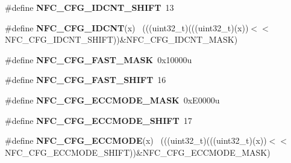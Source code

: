 \begin{DoxyCompactItemize}
\item 
\hypertarget{group___n_f_c___register___masks_gaa0926596a807fb2f899e6c616aeac970}{}\#define {\bfseries N\+F\+C\+\_\+\+C\+F\+G\+\_\+\+I\+D\+C\+N\+T\+\_\+\+S\+H\+I\+F\+T}~13\label{group___n_f_c___register___masks_gaa0926596a807fb2f899e6c616aeac970}

\item 
\hypertarget{group___n_f_c___register___masks_ga80376617d344449f3f0742d6030ebe5a}{}\#define {\bfseries N\+F\+C\+\_\+\+C\+F\+G\+\_\+\+I\+D\+C\+N\+T}(x)                                              ~(((uint32\+\_\+t)(((uint32\+\_\+t)(x))$<$$<$N\+F\+C\+\_\+\+C\+F\+G\+\_\+\+I\+D\+C\+N\+T\+\_\+\+S\+H\+I\+F\+T))\&N\+F\+C\+\_\+\+C\+F\+G\+\_\+\+I\+D\+C\+N\+T\+\_\+\+M\+A\+S\+K)\label{group___n_f_c___register___masks_ga80376617d344449f3f0742d6030ebe5a}

\item 
\hypertarget{group___n_f_c___register___masks_ga1548415338ac875affc2991c4e8018fc}{}\#define {\bfseries N\+F\+C\+\_\+\+C\+F\+G\+\_\+\+F\+A\+S\+T\+\_\+\+M\+A\+S\+K}~0x10000u\label{group___n_f_c___register___masks_ga1548415338ac875affc2991c4e8018fc}

\item 
\hypertarget{group___n_f_c___register___masks_gae75df20705e28a49f9dc7ebfa1d70496}{}\#define {\bfseries N\+F\+C\+\_\+\+C\+F\+G\+\_\+\+F\+A\+S\+T\+\_\+\+S\+H\+I\+F\+T}~16\label{group___n_f_c___register___masks_gae75df20705e28a49f9dc7ebfa1d70496}

\item 
\hypertarget{group___n_f_c___register___masks_ga90671fb470e3ce9e2b9483cffe567d58}{}\#define {\bfseries N\+F\+C\+\_\+\+C\+F\+G\+\_\+\+E\+C\+C\+M\+O\+D\+E\+\_\+\+M\+A\+S\+K}~0x\+E0000u\label{group___n_f_c___register___masks_ga90671fb470e3ce9e2b9483cffe567d58}

\item 
\hypertarget{group___n_f_c___register___masks_gabda91969708ae32be4694093ee1462ec}{}\#define {\bfseries N\+F\+C\+\_\+\+C\+F\+G\+\_\+\+E\+C\+C\+M\+O\+D\+E\+\_\+\+S\+H\+I\+F\+T}~17\label{group___n_f_c___register___masks_gabda91969708ae32be4694093ee1462ec}

\item 
\hypertarget{group___n_f_c___register___masks_ga949bb3e01fd33478a86b8a2e9f46e963}{}\#define {\bfseries N\+F\+C\+\_\+\+C\+F\+G\+\_\+\+E\+C\+C\+M\+O\+D\+E}(x)                                          ~(((uint32\+\_\+t)(((uint32\+\_\+t)(x))$<$$<$N\+F\+C\+\_\+\+C\+F\+G\+\_\+\+E\+C\+C\+M\+O\+D\+E\+\_\+\+S\+H\+I\+F\+T))\&N\+F\+C\+\_\+\+C\+F\+G\+\_\+\+E\+C\+C\+M\+O\+D\+E\+\_\+\+M\+A\+S\+K)\label{group___n_f_c___register___masks_ga949bb3e01fd33478a86b8a2e9f46e963}


\end{DoxyCompactItemize}
